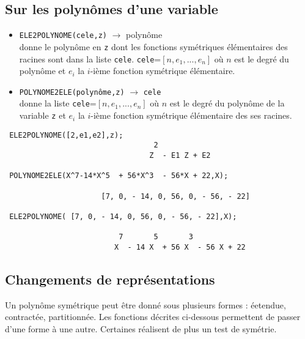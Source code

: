 \subsection{Sur les polyn\^omes d'une variable}
  \begin{itemize}
    \item {\tt ELE2POLYNOME(cele,z)} 
$\longrightarrow$ polyn\^ome\\
donne le polyn\^ome en {\tt z} dont les fonctions
sym\'etriques \'el\'ementaires des racines sont dans la liste {\tt cele}.
{\tt cele}=$[n,e_1,...,e_n]$ o\`u $n$ est le degr\'e du polyn\^ome et
$e_i$ la $i$-i\`eme fonction sym\'etrique \'el\'ementaire.

     \item {\tt POLYNOME2ELE(polyn\^ome,z)} 
$\longrightarrow$ {\tt cele}\\
 donne la liste {\tt cele}=$[n,e_1,...,e_n]$ o\`u $n$ est le
degr\'e du polyn\^ome de la variable {\tt z}
et $e_i$ la $i$-i\`eme fonction sym\'etrique 
\'el\'ementaire des ses racines.
\end{itemize}
\small
\begin{verbatim}
 ELE2POLYNOME([2,e1,e2],z);
                                  2
                                 Z  - E1 Z + E2

 POLYNOME2ELE(X^7-14*X^5  + 56*X^3  - 56*X + 22,X);
 
                      [7, 0, - 14, 0, 56, 0, - 56, - 22] 

 ELE2POLYNOME( [7, 0, - 14, 0, 56, 0, - 56, - 22],X);

                          7       5       3
                         X  - 14 X  + 56 X  - 56 X + 22
\end{verbatim}
\normalsize
\subsection{Changements de repr\'esentations}
Un polyn\^ome sym\'etrique peut \^etre donn\'e sous plusieurs formes :
\'eetendue, contract\'ee, partitionn\'ee. Les fonctions d\'ecrites ci-dessous
permettent de passer d'une forme \`a une autre. Certaines r\'ealisent de plus
un test de sym\'etrie.

